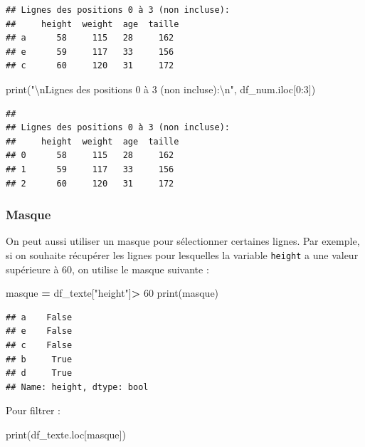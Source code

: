 \documentclass[12pt,]{book}
\newenvironment{Shaded}{\begin{snugshade}}{\end{snugshade}}
\newcommand{\DecValTok}[1]{\textcolor[rgb]{0.00,0.00,0.81}{#1}}
\newcommand{\CharTok}[1]{\textcolor[rgb]{0.31,0.60,0.02}{#1}}
\newcommand{\StringTok}[1]{\textcolor[rgb]{0.31,0.60,0.02}{#1}}
\newcommand{\OperatorTok}[1]{\textcolor[rgb]{0.81,0.36,0.00}{\textbf{#1}}}
\newcommand{\BuiltInTok}[1]{#1}
\newcommand{\NormalTok}[1]{#1}
\numberwithin{equation}{section}
\numberwithin{countremarque}{section}
\begin{document}
\begin{lstlisting}
## Lignes des positions 0 à 3 (non incluse):
##     height  weight  age  taille
## a      58     115   28     162
## e      59     117   33     156
## c      60     120   31     172
\end{lstlisting}

\begin{Shaded}
\begin{Highlighting}[]
\BuiltInTok{print}\NormalTok{(}\StringTok{"}\CharTok{\textbackslash{}n}\StringTok{Lignes des positions 0 à 3 (non incluse):}\CharTok{\textbackslash{}n}\StringTok{"}\NormalTok{, df_num.iloc[}\DecValTok{0}\NormalTok{:}\DecValTok{3}\NormalTok{])}
\end{Highlighting}
\end{Shaded}

\begin{lstlisting}
## 
## Lignes des positions 0 à 3 (non incluse):
##     height  weight  age  taille
## 0      58     115   28     162
## 1      59     117   33     156
## 2      60     120   31     172
\end{lstlisting}

\subsubsection{Masque}\label{masque-extraction-ligne}

On peut aussi utiliser un masque pour sélectionner certaines lignes. Par
exemple, si on souhaite récupérer les lignes pour lesquelles la variable
\texttt{height} a une valeur supérieure à 60, on utilise le masque
suivante :

\begin{Shaded}
\begin{Highlighting}[]
\NormalTok{masque }\OperatorTok{=}\NormalTok{ df_texte[}\StringTok{"height"}\NormalTok{]}\OperatorTok{>} \DecValTok{60}
\BuiltInTok{print}\NormalTok{(masque)}
\end{Highlighting}
\end{Shaded}

\begin{lstlisting}
## a    False
## e    False
## c    False
## b     True
## d     True
## Name: height, dtype: bool
\end{lstlisting}

Pour filtrer :

\begin{Shaded}
\begin{Highlighting}[]
\BuiltInTok{print}\NormalTok{(df_texte.loc[masque])}
\end{Highlighting}
\end{Shaded}
\end{document}
